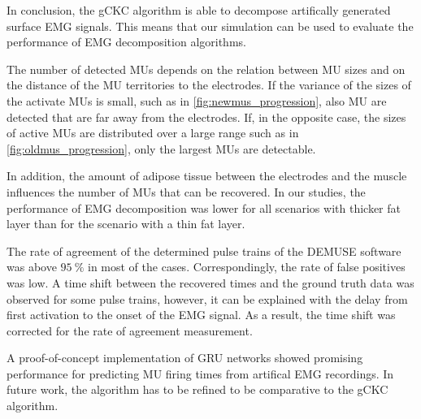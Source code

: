 In conclusion, the gCKC algorithm is able to decompose artifically generated surface EMG signals. This means that our simulation can be used to evaluate the performance of EMG decomposition algorithms.

The number of detected MUs depends on the relation between MU sizes and on the distance of the MU territories to the electrodes. If the variance of the sizes of the activate MUs is small, such as in \cref{fig:newmus_progression}, also MU are detected that are far away from the electrodes. If, in the opposite case, the sizes of active MUs are distributed over a large range such as in \cref{fig:oldmus_progression}, only the largest MUs are detectable.

In addition, the amount of adipose tissue between the electrodes and the muscle influences the number of MUs that can be recovered. In our studies, the performance of EMG decomposition was lower for all scenarios with thicker fat layer than for the scenario with a thin fat layer.

The rate of agreement of the determined pulse trains of the DEMUSE software was above $\SI{95}{\percent}$ in most of the cases. Correspondingly, the rate of false positives was low.
A time shift between the recovered times and the ground truth data was observed for some pulse trains, however, it can be explained with the delay from first activation to the onset of the EMG signal. As a result, the time shift was corrected for the rate of agreement measurement.

A proof-of-concept implementation of GRU networks showed promising performance for predicting MU firing times from artifical EMG recordings. In future work, the algorithm has to be refined to be comparative to the gCKC algorithm.



